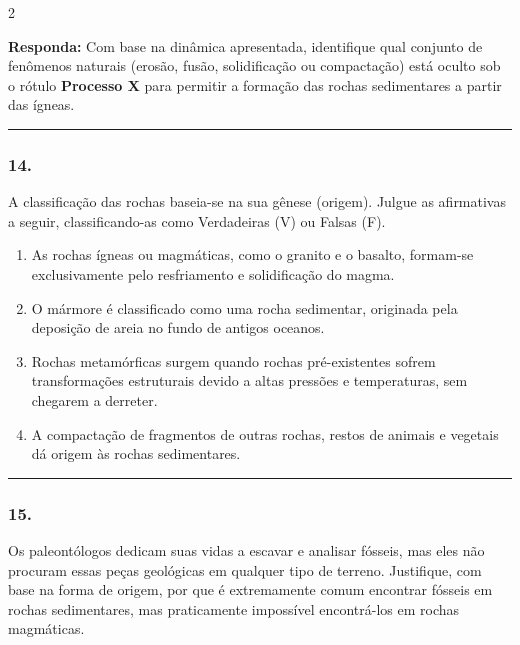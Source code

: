 \documentclass[twoside, 10pt, a4paper]{article}
\newlength{\espacoPreQuestao}
\newlength{\espacoQuestao}
\newlength{\espacoAlt}
\begin{document}
\begin{multicols*}{2}
\begin{boxresponda}
\textbf{Responda:} Com base na dinâmica apresentada, identifique qual conjunto de fenômenos naturais (erosão, fusão, solidificação ou compactação) está oculto sob o rótulo \textbf{Processo X} para permitir a formação das rochas sedimentares a partir das ígneas.
\end{boxresponda}
\par\vspace{\espacoQuestao}

\noindent\textcolor{CorLinha}{\rule{\linewidth}{0.5pt}} 
\par\vspace{\espacoPreQuestao}
\subsubsection*{14.} A classificação das rochas baseia-se na sua gênese (origem). Julgue as afirmativas a seguir, classificando-as como Verdadeiras (V) ou Falsas (F).

\begin{enumerate}[label=(\ \ ), itemsep=\espacoAlt]
\item As rochas ígneas ou magmáticas, como o granito e o basalto, formam-se exclusivamente pelo resfriamento e solidificação do magma.
\item O mármore é classificado como uma rocha sedimentar, originada pela deposição de areia no fundo de antigos oceanos.
\item Rochas metamórficas surgem quando rochas pré-existentes sofrem transformações estruturais devido a altas pressões e temperaturas, sem chegarem a derreter.
\item A compactação de fragmentos de outras rochas, restos de animais e vegetais dá origem às rochas sedimentares.
\end{enumerate}
\par\vspace{\espacoQuestao}

\noindent\textcolor{CorLinha}{\rule{\linewidth}{0.5pt}} 
\par\vspace{\espacoPreQuestao}
\subsubsection*{15.} Os paleontólogos dedicam suas vidas a escavar e analisar fósseis, mas eles não procuram essas peças geológicas em qualquer tipo de terreno. Justifique, com base na forma de origem, por que é extremamente comum encontrar fósseis em rochas sedimentares, mas praticamente impossível encontrá-los em rochas magmáticas.
\par\vspace{\espacoQuestao}


\end{multicols*}
\end{document}
